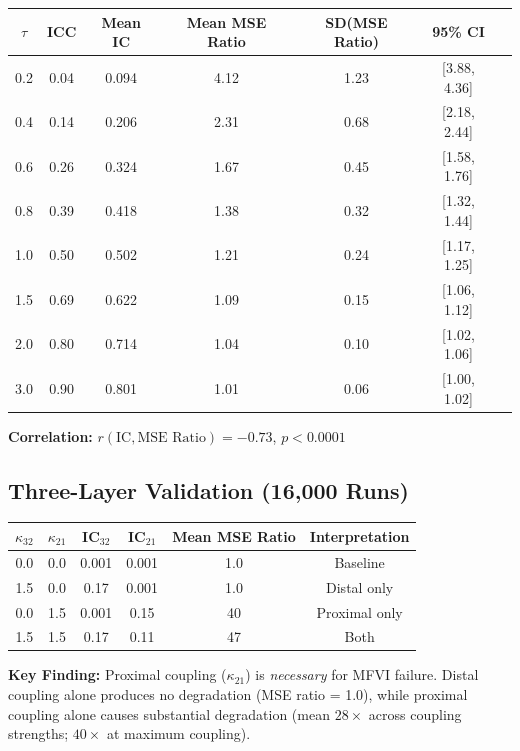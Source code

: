 \documentclass[10pt]{article} %
\theoremstyle{plain}
\theoremstyle{definition}
\newcommand{\IC}{\mathrm{IC}}  %
\begin{document}
\begin{center}
\begin{tabular}{ccccccc}
\toprule
$\tau$ & ICC & Mean IC & Mean MSE Ratio & SD(MSE Ratio) & 95\% CI \\
\midrule
0.2 & 0.04 & 0.094 & 4.12 & 1.23 & [3.88, 4.36] \\
0.4 & 0.14 & 0.206 & 2.31 & 0.68 & [2.18, 2.44] \\
0.6 & 0.26 & 0.324 & 1.67 & 0.45 & [1.58, 1.76] \\
0.8 & 0.39 & 0.418 & 1.38 & 0.32 & [1.32, 1.44] \\
1.0 & 0.50 & 0.502 & 1.21 & 0.24 & [1.17, 1.25] \\
1.5 & 0.69 & 0.622 & 1.09 & 0.15 & [1.06, 1.12] \\
2.0 & 0.80 & 0.714 & 1.04 & 0.10 & [1.02, 1.06] \\
3.0 & 0.90 & 0.801 & 1.01 & 0.06 & [1.00, 1.02] \\
\bottomrule
\end{tabular}
\end{center}

\textbf{Correlation:} $r(\IC, \text{MSE Ratio}) = -0.73$, $p < 0.0001$

\subsection{Three-Layer Validation (16,000 Runs)}

\begin{center}
\begin{tabular}{cccccc}
\toprule
$\kappa_{32}$ & $\kappa_{21}$ & IC$_{32}$ & IC$_{21}$ & Mean MSE Ratio & Interpretation \\
\midrule
0.0 & 0.0 & 0.001 & 0.001 & 1.0 & Baseline \\
1.5 & 0.0 & 0.17 & 0.001 & 1.0 & Distal only \\
0.0 & 1.5 & 0.001 & 0.15 & 40 & Proximal only \\
1.5 & 1.5 & 0.17 & 0.11 & 47 & Both \\
\bottomrule
\end{tabular}
\end{center}

\textbf{Key Finding:} Proximal coupling ($\kappa_{21}$) is \emph{necessary} for MFVI failure. Distal coupling alone produces no degradation (MSE ratio = 1.0), while proximal coupling alone causes substantial degradation (mean $28\times$ across coupling strengths; $40\times$ at maximum coupling).
\end{document}
